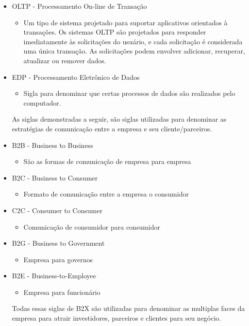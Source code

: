 \documentclass[
	12pt,				%
	openany,			%
	a4paper,			%
	chapter=TITLE,		%
	section=TITLE,		%
	english,
	brazil				%
]{abntex2}
\begin{document}
\begin{itemize}
\item OLTP - Processamento On-line de Transação 
	\begin{itemize}
		\item[] Um tipo de sistema projetado para suportar aplicativos orientados à transações. Os sistemas OLTP são projetados para responder imediatamente às solicitações do usuário, e cada solicitação é considerada uma única transação. As solicitações podem envolver adicionar, recuperar, atualizar ou remover dados.
	\end{itemize}


\item EDP - Processamento Eletrônico de Dados
	\begin{itemize}
		\item[] Sigla para denominar que certas processos de dados são realizados pelo computador.
	\end{itemize}


\newpage
As siglas demonstradas a seguir, são siglas utilizadas para denominar as estratégias de comunicação entre a empresa e seu cliente/parceiros.

\item B2B - Business to Business
	\begin{itemize}
		\item[] São as formas de comunicação de empresa para empresa 
	\end{itemize}

\item B2C - Business to Consumer
	\begin{itemize}
		\item[] Formato de comunicação entre a empresa o consumidor
	\end{itemize}

\item C2C - Consumer to Consumer
	\begin{itemize}
		\item[] Comunicação de consumidor para consumidor
	\end{itemize}

\item B2G - Business to Government
	\begin{itemize}
		\item[] Empresa para governos
	\end{itemize}

\item B2E - Business-to-Employee
	\begin{itemize}
		\item[] Empresa para funcionário
	\end{itemize}

Todas essas siglas de B2X são utilizadas para denominar as multiplas faces da empresa para atrair investidores, parceiros e clientes para seu negócio.

\end{itemize}
\end{document}
